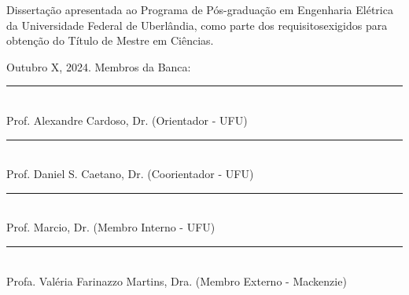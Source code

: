 
\newpage
\thispagestyle{empty}   %
\begin{center}
\ABNTEXchapterfont\large\imprimirautor
\vskip 4cm
\ABNTEXchapterfont\bfseries\Large\imprimirtitulo
\end{center}
\vskip 2cm


\hfill                                                         %
\begin{minipage}{11cm}
Dissertação apresentada ao Programa de Pós-graduação em Engenharia Elétrica da Universidade Federal de Uberlândia, como parte dos requisitosexigidos para obtenção do Título de Mestre em Ciências.

\end{minipage}
\vskip 0.5cm
\noindent  Outubro X, 2024.
\vskip 0.5cm
\noindent Membros da Banca:
\vskip 1cm
\vspace{-0.5cm}

\begin{center}
    \rule{7.5cm}{0.4mm}\\
    Prof. Alexandre Cardoso, Dr. (Orientador - UFU)

    \vspace{0.5cm}
    \rule{7.5cm}{0.4mm}\\
    Prof. Daniel S. Caetano, Dr. (Coorientador - UFU)

    \vspace{0.5cm}
    \rule{7.5cm}{0.4mm}\\
    Prof. Marcio, Dr. (Membro Interno - UFU)

    \vspace{0.5cm}
    \rule{7.5cm}{0.4mm}\\
    Profa. Valéria Farinazzo Martins, Dra. (Membro Externo - Mackenzie)
\end{center}